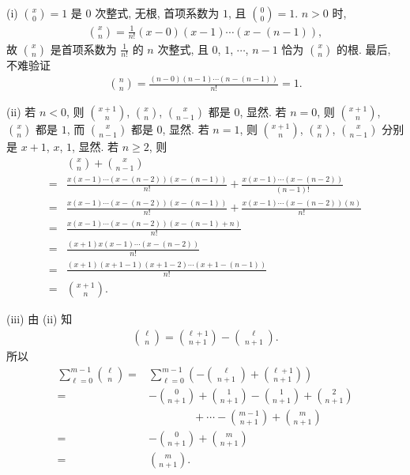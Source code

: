 \begin{pf}
    (i) $\binom{x}{0} = 1$ 是 $0$ 次整式, 无根, 首项系数为 $1$, 且 $\binom{0}{0} = 1$. $n > 0$ 时,
    \begin{align*}
        \binom{x}{n} = \frac{1}{n!} (x - 0)(x - 1) \cdots (x - (n-1)),
    \end{align*}
    故 $\binom{x}{n}$ 是首项系数为 $\frac{1}{n!}$ 的 $n$ 次整式, 且 $0$, $1$, $\cdots$, $n-1$ 恰为 $\binom{x}{n}$ 的根. 最后, 不难验证
    \begin{align*}
        \binom{n}{n} = \frac{(n-0)(n-1) \cdots (n - (n-1))}{n!} = 1.
    \end{align*}

    (ii) 若 $n<0$, 则 $\binom{x + 1}{n}$, $\binom{x}{n}$, $\binom{x}{n - 1}$ 都是 $0$, 显然. 若 $n=0$, 则 $\binom{x + 1}{n}$, $\binom{x}{n}$ 都是 $1$, 而 $\binom{x}{n - 1}$ 都是 $0$, 显然. 若 $n = 1$, 则 $\binom{x + 1}{n}$, $\binom{x}{n}$, $\binom{x}{n - 1}$ 分别是 $x+1$, $x$, $1$, 显然. 若 $n \geq 2$, 则
    \begin{align*}
             & \binom{x}{n} + \binom{x}{n - 1}                                                      \\
        = {} & \frac{x(x-1) \cdots (x-(n-2))(x-(n-1))}{n!} + \frac{x(x-1) \cdots (x-(n-2))}{(n-1)!} \\
        = {} & \frac{x(x-1) \cdots (x-(n-2))(x-(n-1))}{n!} + \frac{x(x-1) \cdots (x-(n-2))(n)}{n!}  \\
        = {} & \frac{x(x-1) \cdots (x-(n-2))(x-(n-1) + n)}{n!}                                      \\
        = {} & \frac{(x+1)x(x-1) \cdots (x-(n-2))}{n!}                                              \\
        = {} & \frac{(x+1)(x+1-1)(x+1-2) \cdots (x+1-(n-1))}{n!}                                    \\
        = {} & \binom{x + 1}{n}.
    \end{align*}

    (iii) 由 (ii) 知
    \begin{align*}
        \binom{\ell}{n} = \binom{\ell + 1}{n + 1} - \binom{\ell}{n + 1}.
    \end{align*}
    所以
    \begin{align*}
        \sum_{\ell = 0}^{m - 1} \binom{\ell}{n}
        = {} & \sum_{\ell = 0}^{m - 1} \left(-\binom{\ell}{n + 1}
        + \binom{\ell + 1}{n + 1} \right)                             \\
        = {} & -\binom{0}{n + 1} + \binom{1}{n + 1} -\binom{1}{n + 1}
        + \binom{2}{n + 1}                                            \\
             & \qquad \qquad
        + \cdots -\binom{m-1}{n + 1} + \binom{m}{n + 1}               \\
        = {} & -\binom{0}{n + 1} + \binom{m}{n + 1}                   \\
        = {} & \binom{m}{n + 1}.
    \end{align*}


\end{pf}
